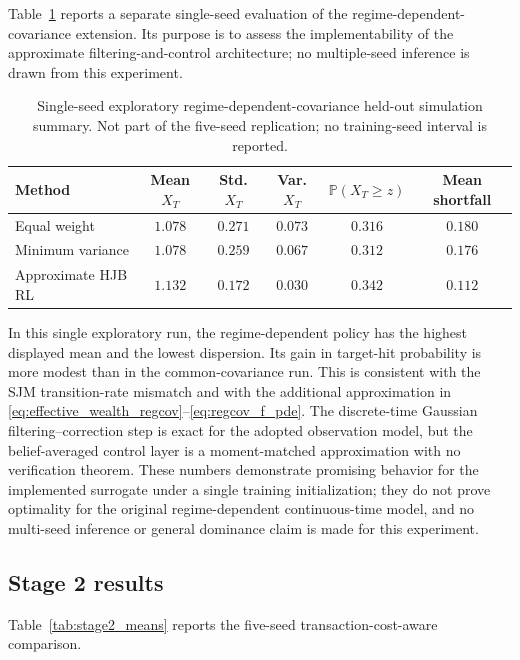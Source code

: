 \documentclass[a4paper,10pt]{article}
\newcommand{\Pbb}{\mathbb{P}}
\begin{document}
Table~\ref{tab:regcov_metrics} reports a separate single-seed evaluation
of the regime-dependent-covariance extension. Its purpose is to assess the
implementability of the approximate filtering-and-control architecture; no
multiple-seed inference is drawn from this experiment.

\begin{table}[H]
\centering
\small
\caption{Single-seed exploratory regime-dependent-covariance held-out simulation summary. Not part of the five-seed replication; no training-seed interval is reported.}
\label{tab:regcov_metrics}
\begin{tabular}{lccccc}
\toprule
Method & Mean $X_T$ & Std. $X_T$ & Var. $X_T$ & $\Pbb(X_T\ge z)$ & Mean shortfall \\
\midrule
Equal weight & $1.078$ & $0.271$ & $0.073$ & $0.316$ & $0.180$ \\
Minimum variance & $1.078$ & $0.259$ & $0.067$ & $0.312$ & $0.176$ \\
Approximate HJB RL & $1.132$ & $0.172$ & $0.030$ & $0.342$ & $0.112$ \\
\bottomrule
\end{tabular}
\end{table}

In this single exploratory run, the regime-dependent policy has the highest displayed mean and the lowest dispersion. Its gain in target-hit probability is more modest than in the common-covariance run. This is consistent with the SJM transition-rate mismatch and with the additional approximation in \eqref{eq:effective_wealth_regcov}--\eqref{eq:regcov_f_pde}. The discrete-time Gaussian filtering--correction step is exact for the adopted observation model, but the belief-averaged control layer is a moment-matched approximation with no verification theorem. These numbers demonstrate promising behavior for the implemented surrogate under a single training initialization; they do not prove optimality for the original regime-dependent continuous-time model, and no multi-seed inference or general dominance claim is made for this experiment.

\subsection{Stage 2 results}

Table~\ref{tab:stage2_means} reports the five-seed transaction-cost-aware comparison.
\end{document}
